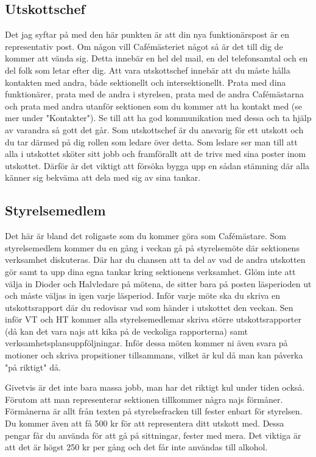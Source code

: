 \documentclass[10pt]{article}
\begin{document}
\subsection{Utskottschef}
Det jag syftar på med den här punkten är att din nya funktionärspost är en representativ post. Om någon vill Cafémästeriet något så är det till dig de kommer att vända sig. Detta innebär en hel del mail, en del telefonsamtal och en del folk som letar efter dig. Att vara utskottschef innebär att du måste hålla kontakten med andra, både sektionellt och intersektionellt. Prata med dina funktionärer, prata med de andra i styrelsen, prata med de andra Cafémästarna och prata med andra utanför sektionen som du kommer att ha kontakt med (se mer under "Kontakter"). Se till att ha god kommunikation med dessa och ta hjälp av varandra så gott det går. Som utskottschef är du ansvarig för ett utskott och du tar därmed på dig rollen som ledare över detta. Som ledare ser man till att alla i utskottet sköter sitt jobb och framförallt att de trivs med sina poster inom utskottet. Därför är det viktigt att försöka bygga upp en sådan stämning där alla känner sig bekväma att dela med sig av sina tankar.

\subsection{Styrelsemedlem}
Det här är bland det roligaste som du kommer göra som Cafémästare. Som styrelsemedlem kommer du en gång i veckan gå på styrelsemöte där sektionens verksamhet diskuteras. Där har du chansen att ta del av vad de andra utskotten gör samt ta upp dina egna tankar kring sektionens verksamhet. Glöm inte att välja in Dioder och Halvledare på mötena, de sitter bara på posten läsperioden ut och måste väljas in igen varje läsperiod. Inför varje möte ska du skriva en utskottsrapport där du redovisar vad som händer i utskottet den veckan. Sen inför VT och HT kommer alla styrelsemedlemar skriva större utskottsrapporter (då kan det vara najs att kika på de veckoliga rapporterna) samt verksamhetsplansuppföljningar. Inför dessa möten kommer ni även svara på motioner och skriva propsitioner tillsammans, vilket är kul då man kan påverka "på riktigt" då.

Givetvis är det inte bara massa jobb, man har det riktigt kul under tiden också. Förutom att man representerar sektionen tillkommer några najs förmåner.
Förmånerna är allt från texten på styrelsefracken till fester enbart för styrelsen. Du kommer även att få 500 kr för att representera ditt utskott med. Dessa pengar får du använda för att gå på sittningar, fester med mera. Det viktiga är att det är högst 250 kr per gång och det får inte användas till alkohol.
\end{document}
